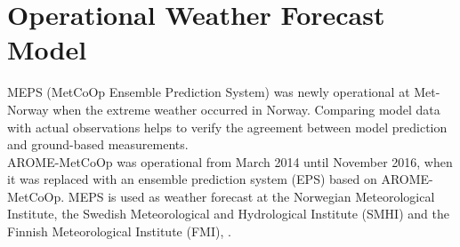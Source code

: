 \section{Operational Weather Forecast Model}\label{sec:DIM:MEPS}
MEPS (MetCoOp Ensemble Prediction System) was newly operational at Met-Norway when the extreme weather occurred in Norway. Comparing model data with actual observations helps to verify the agreement between model prediction and ground-based measurements. 
\\
AROME-MetCoOp was operational from March 2014 until November 2016, when it was replaced with an ensemble prediction system (EPS) based on AROME-MetCoOp.
MEPS is used as weather forecast at the Norwegian Meteorological Institute, the Swedish Meteorological and Hydrological Institute (SMHI) and the Finnish Meteorological Institute (FMI), \citep{muller_arome-metcoop:_2017, koltzow_metcoop_2017}.
\\
\\
